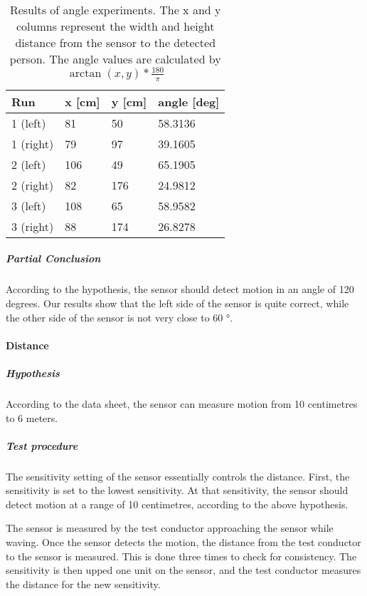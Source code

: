 \begin{table}[htbp]
\centering
\begin{tabular}{@{}llll@{}}
\toprule
Run & x [cm] & y [cm] & angle [deg] \\ \midrule
1 (left) & 81 & 50 & 58.3136 \\
1 (right) & 79 & 97 & 39.1605  \\ \midrule
2 (left) & 106 & 49 & 65.1905 \\
2 (right) & 82 & 176 & 24.9812 \\ \midrule
3 (left) & 108 & 65 & 58.9582 \\
3 (right) & 88 & 174 & 26.8278 \\ \bottomrule
\end{tabular}
\caption[Angle experiment results]{Results of angle experiments. The x and y columns represent the width and height
  distance from the sensor to the detected person. The angle values are
  calculated by $\arctan (x,y) * \frac{180}{\pi}$}
\label{tab:pir_angle}
\end{table}

\subparagraph{Partial Conclusion}
\label{subp:AngPartial_conclusion}

According to the hypothesis, the sensor should detect motion in an angle of 120 degrees. Our results show that the left side of the sensor is quite correct, while the other side of the sensor is not very close to 60 $\si{\degree}$.

\paragraph{Distance}

\subparagraph{Hypothesis}

According to the data sheet, the sensor can measure motion from 10 centimetres to
6 meters.

\subparagraph{Test procedure}

The sensitivity setting of the sensor essentially controls the distance. First,
the sensitivity is set to the lowest sensitivity. At that sensitivity, the
sensor should detect motion at a range of 10 centimetres, according to the above
hypothesis.

The sensor is measured by the test conductor approaching the sensor while
waving. Once the sensor detects the motion, the distance from the test conductor
to the sensor is measured. This is done three times to check for consistency. The sensitivity is then upped one unit on the sensor,
and the test conductor measures the distance for the new sensitivity.

